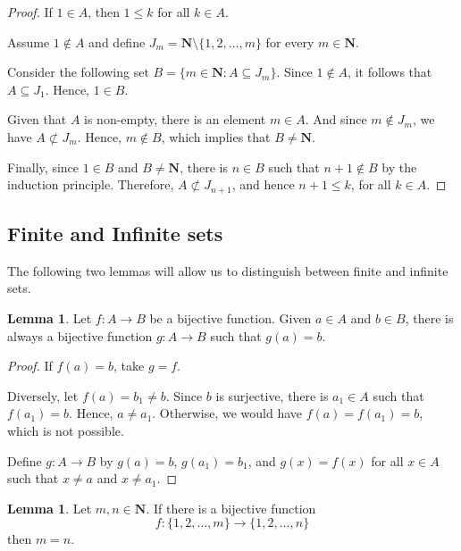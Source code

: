 \documentclass[tikz,12pt,a4paper]{article}
\theoremstyle{definition}
\newtheorem{lemma}[theorem]{Lemma}
\begin{document}
\begin{proof}
	If $1 \in A$, then $1 \leq k$ for all $k \in A$.
	
	Assume $1 \notin A$ and define $J_m = \textbf{N} \setminus \{1,2,\ldots, m\}$ for every $m \in \textbf{N}$.
	
	Consider the following set $B = \{ m \in \textbf{N} : A \subseteq J_m \}$. Since $1 \notin A$, it follows that $A \subseteq J_1$. Hence, $1 \in B$. 
	
	Given that $A$ is non-empty, there is an element $m \in A$. And since $m \notin J_m$, we have $A \not\subset J_m$. Hence, $m \notin B$, which implies that $B \neq \textbf{N}$. 
	
	Finally, since $1 \in B$ and $B \neq \textbf{N}$, there is $n \in B$ such that $n+1 \notin B$ by the induction principle. Therefore, $A \not\subset J_{n+1}$, and hence $n+1 \leq k$, for all $k \in A$.
\end{proof}

\subsection{Finite and Infinite sets}

The following two lemmas will allow us to distinguish between finite and infinite sets.

\begin{lemma}\label{two-bij-fun}
	Let $f:A \longrightarrow B$ be a bijective function. Given $a \in A$ and $b \in B$, there is always a bijective function $g : A \longrightarrow B$ such that $g(a) = b$.
\end{lemma}

\begin{proof}
	If $f(a)=b$, take $g = f$. 
	
	Diversely, let $f(a) = b_1 \neq b$. Since $b$ is surjective, there is $a_1 \in A$ such that $f(a_1) = b$. Hence, $a \neq a_1$. Otherwise, we would have $f(a) = f(a_1) = b$, which is not possible.
	
	Define $g : A \longrightarrow B$ by $g(a) = b$, $g(a_1) = b_1$, and $g(x) = f(x)$ for all $x \in A$ such that $x \neq a$ and $x \neq a_1$.
\end{proof}

\begin{lemma}\label{snd-lemma}
	Let $m,n \in \textbf{N}$. If there is a bijective function 
	\[
		f : \{ 1, 2, \ldots, m \} \longrightarrow \{ 1, 2, \ldots, n \}
	\]
	then $m=n$.
\end{lemma}
\end{document}
